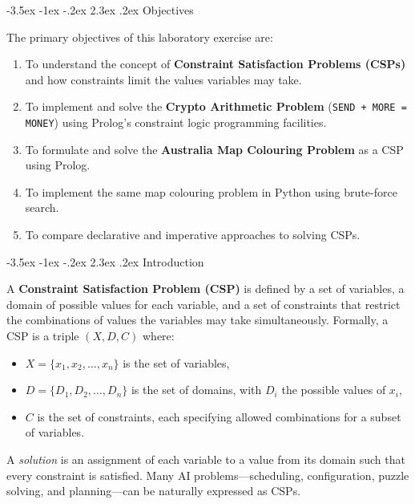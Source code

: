 \documentclass[12pt,a4paper]{article}
\makeatletter
\renewcommand{\section}{\@startsection{section}{1}{\z@}%
  {-3.5ex \@plus -1ex \@minus -.2ex}%
  {2.3ex \@plus.2ex}%
  {\normalfont\Large\bfseries}}
\makeatother
\begin{document}
\tableofcontents
\newpage

\section{Objectives}

The primary objectives of this laboratory exercise are:

\begin{enumerate}
    \item To understand the concept of \textbf{Constraint Satisfaction Problems (CSPs)} and how constraints limit the values variables may take.
    \item To implement and solve the \textbf{Crypto Arithmetic Problem} (\texttt{SEND + MORE = MONEY}) using Prolog's constraint logic programming facilities.
    \item To formulate and solve the \textbf{Australia Map Colouring Problem} as a CSP using Prolog.
    \item To implement the same map colouring problem in Python using brute-force search.
    \item To compare declarative and imperative approaches to solving CSPs.
\end{enumerate}

\section{Introduction}

A \textbf{Constraint Satisfaction Problem (CSP)} is defined by a set of variables, a domain of possible values for each variable, and a set of constraints that restrict the combinations of values the variables may take simultaneously.  Formally, a CSP is a triple $(X, D, C)$ where:

\begin{itemize}
    \item $X = \{x_1, x_2, \dots, x_n\}$ is the set of variables,
    \item $D = \{D_1, D_2, \dots, D_n\}$ is the set of domains, with $D_i$ the possible values of $x_i$,
    \item $C$ is the set of constraints, each specifying allowed combinations for a subset of variables.
\end{itemize}

A \textit{solution} is an assignment of each variable to a value from its domain such that every constraint is satisfied.  Many AI problems---scheduling, configuration, puzzle solving, and planning---can be naturally expressed as CSPs.
\end{document}
